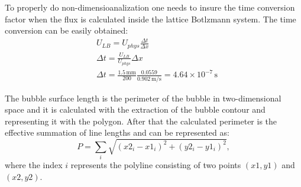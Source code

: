 \documentclass{article}
\begin{document}
To properly do
non-dimensioanalization one needs to insure the time conversion factor when the flux is calculated
inside the lattice Botlzmann system. The time conversion can be easily obtained:
\begin{equation}
\begin{aligned}
&U_{LB}=U_{phys}\frac{\Delta t}{\Delta x}\\
&\Delta t=\frac{U_{LB}}{U_{phys}}\Delta x\\
&\Delta t=\frac{1.5\,\mathrm{mm}}{200} \frac{0.0559}{0.902\,\mathrm{m/s}}=4.64\times
10^{-7}\,\mathrm{s} 
\end{aligned}
\end{equation}

The bubble surface length is the perimeter of the bubble in two-dimensional space and it is
calculated with the extraction of the bubble contour and representing it with the polygon. After
that the calculated perimeter is the effective summation of line lengths and can be represented as:
\begin{equation}
P=\sum_i{\sqrt{(x2_i-x1_i)^2+(y2_i-y1_i)^2}},
\end{equation}
where the index $i$ represents the polyline consisting of two points $(x1,y1)$ and $(x2,y2)$.
\end{document}
